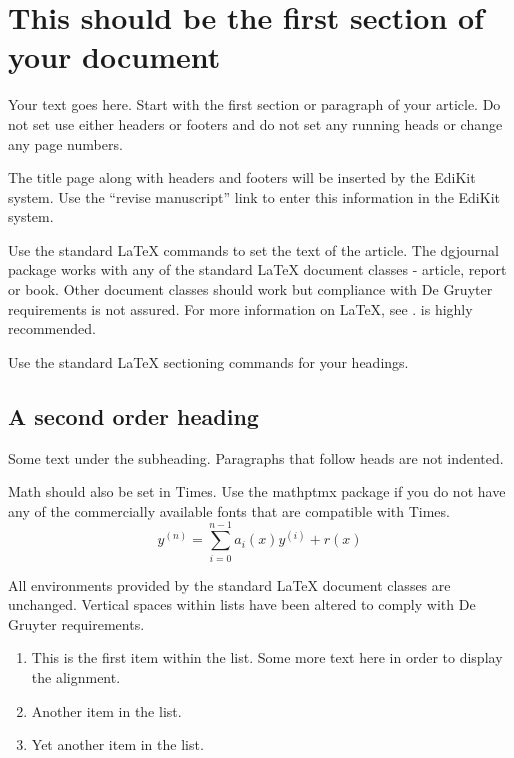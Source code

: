 \documentclass[letterpaper,12pt]{article}
\begin{document}

\section{This should be the first section of your document}

Your text goes here. Start with the first section or paragraph of your
article. Do not set use either headers or footers and do not set any running
heads or change any page numbers.

The title page along with headers and footers will be inserted by the EdiKit
system. Use the ``revise manuscript'' link to enter this information in the
EdiKit system.

Use the standard LaTeX commands to set the text of the article. The dgjournal
package works with any of the standard LaTeX document classes - article, report
or book. Other document classes should work but compliance with De Gruyter
requirements is not assured. For more information on LaTeX, see
\cite{lamport,mittelbach,oetiker}. \cite{mittelbach} is highly recommended.

Use the standard LaTeX sectioning commands for your headings.

\subsection{A second order heading}

Some text under the subheading. Paragraphs that follow heads are not
indented.

Math should also be set in Times. Use the mathptmx package if you do not have
any of the commercially available fonts that are compatible with Times.
\begin{equation}
    y^{(n)} = \sum_{i=0}^{n-1} a_i(x) y^{(i)} + r(x) 
\end{equation}

All environments provided by the standard LaTeX document classes are
unchanged. Vertical spaces within lists have been altered to comply with De Gruyter
requirements.
\begin{enumerate}
\item This is the first item within the list. Some more text here in order to
  display the alignment.
\item Another item in the list.
\item Yet another item in the list.
\end{enumerate}
\end{document}

